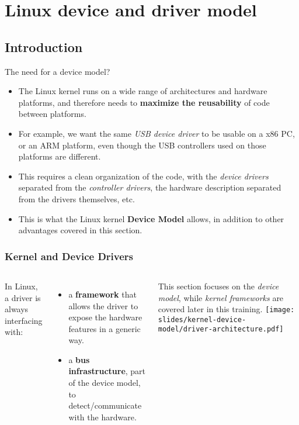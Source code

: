 \section{Linux device and driver model}

\subsection{Introduction}

\begin{frame}{The need for a device model?}
  \begin{itemize}
  \item The Linux kernel runs on a wide range of architectures and
    hardware platforms, and therefore needs to {\bf maximize the
      reusability} of code between platforms.
  \item For example, we want the same {\em USB device driver} to be
    usable on a x86 PC, or an ARM platform, even though the USB
    controllers used on those platforms are different.
  \item This requires a clean organization of the code, with the {\em
      device drivers} separated from the {\em controller drivers}, the
    hardware description separated from the drivers themselves, etc.
  \item This is what the Linux kernel {\bf Device Model} allows, in
    addition to other advantages covered in this section.
  \end{itemize}
\end{frame}

\begin{frame}
  \frametitle{Kernel and Device Drivers}
  \begin{columns}
     In Linux, a driver is always interfacing
    with:
    \begin{itemize}
    \item a {\bf framework} that allows the driver to expose the
      hardware features in a generic way.
    \item a {\bf bus infrastructure}, part of the device model, to
      detect/communicate with the hardware.
    \end{itemize}
    This section focuses on the {\em device model}, while {\em kernel
      frameworks} are covered later in this training.
    \texttt{[image: slides/kernel-device-model/driver-architecture.pdf]}
  \end{columns}
\end{frame}

